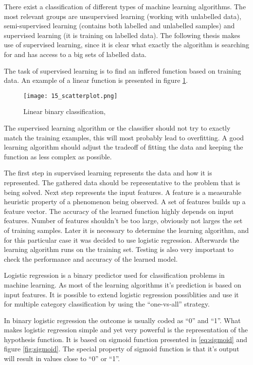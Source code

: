 There exist a classification of different types of machine learning algorithms. The most relevant groups are unsupervised learning (working with unlabelled data), semi-supervised learning (contains both labelled and unlabelled samples) and supervised learning (it is training on labelled data). The following thesis makes use of supervised learning, since it is clear what exactly the algorithm is searching for and has access to a big sets of labelled data.

The task of supervised learning is to find an inffered function based on training data. An example of a linear function is presented in figure \ref{fig:scatterplot}. 

\begin{figure}[!ht]
\centering
  \texttt{[image: 15\_scatterplot.png]}
\caption{Linear binary classification, \cite{scatterplot}}
\label{fig:scatterplot}
\end{figure}

The supervised learning algorithm or the classifier should not try to exactly match the training examples, this will most probably lead to overfitting. A good learning algorithm should adjust the tradeoff of fitting the data and keeping the function as less complex as possible.

The first step in supervised learning represents the data and how it is represented. The gathered data should be representative to the problem that is being solved. Next step represents the input features. A feature is a measurable heuristic property of a phenomenon being observed. A set of features builds up a feature vector. The accuracy of the learned function highly depends on input features. Number of features shouldn't be too large, obviously not larges the set of training samples. Later it is necessary to determine the learning algorithm, and for this particular case it was decided to use logistic regression. Afterwards the learning algorithm runs on the training set. Testing is also very important to check the performance and accuracy of the learned model. 

Logistic regression is a binary predictor used for classification problems in machine learning. As most of the learning algorithms it's prediction is based on input features. It is possible to extend logistic regression possiblities and use it for multiple category classification by using the ``one-vs-all'' strategy. 

In binary logistic regression the outcome is usually coded as ``0'' and ``1''. What makes logistic regression simple and yet very powerful is the representation of the hypothesis function. It is based on sigmoid function presented in \eqref{eq:sigmoid} and figure \ref{fig:sigmoid}. The special property of sigmoid function is that it's output will result in values close to ``0'' or ``1''.

